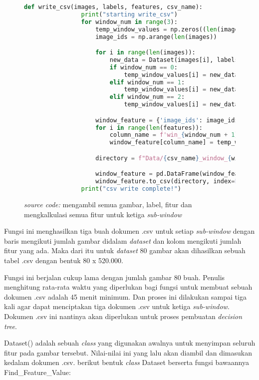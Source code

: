	\begin{figure}[H]
		\begin{lstlisting}[language=Python, basicstyle=\tiny]
			def write_csv(images, labels, features, csv_name):
				print("starting write_csv")
				for window_num in range(3):
					temp_window_values = np.zeros((len(images), len(features)), dtype=object)
					image_ids = np.arange(len(images))

					for i in range(len(images)):
						new_data = Dataset(images[i], labels[i], features)
						if window_num == 0:
							temp_window_values[i] = new_data.window_1_features
						elif window_num == 1:
							temp_window_values[i] = new_data.window_2_features
						elif window_num == 2:
							temp_window_values[i] = new_data.window_3_features

					window_feature = {'image_ids': image_ids}
					for i in range(len(features)):
						column_name = f'win_{window_num + 1}_feature_{i}'
						window_feature[column_name] = temp_window_values[:, i]

					directory = f"Data/{csv_name}_window_{window_num}.csv"

					window_feature = pd.DataFrame(window_feature)
					window_feature.to_csv(directory, index=False)
				print("csv write complete!")
		\end{lstlisting}
		\caption{\emph{source code:} mengambil semua gambar, label, fitur dan mengkalkulasi 
		semua fitur untuk ketiga \textit{sub-window}}
		\label{code:calculate all features}
	\end{figure}

	Fungsi ini menghasilkan tiga buah dokumen .csv untuk setiap \textit{sub-window} dengan
	baris mengikuti jumlah gambar didalam \textit{dataset} dan kolom mengikuti jumlah fitur yang ada. 
	Maka dari itu untuk \emph{dataset} 80 gambar akan dihasilkan sebuah tabel .csv dengan 
	bentuk 80 x 520.000.

	Fungsi ini berjalan cukup lama dengan jumlah gambar 80 buah. Penulis menghitung rata-rata 
	waktu yang diperlukan bagi fungsi untuk membuat sebuah dokumen .csv adalah 45 menit minimum. 
	Dan proses ini dilakukan sampai tiga kali agar dapat menciptakan tiga dokumen .csv untuk ketiga 
	\textit{sub-window}. Dokumen .csv ini nantinya akan diperlukan untuk proses pembuatan \emph{decision tree}.

	Dataset() adalah sebuah \textit{class} yang digunakan awalnya untuk menyimpan seluruh fitur 
	pada gambar tersebut. Nilai-nilai ini yang lalu akan diambil dan dimasukan kedalam dokumen .csv. 
	berikut bentuk \textit{class} Dataset berserta fungsi bawaannya Find\_Feature\_Value:

